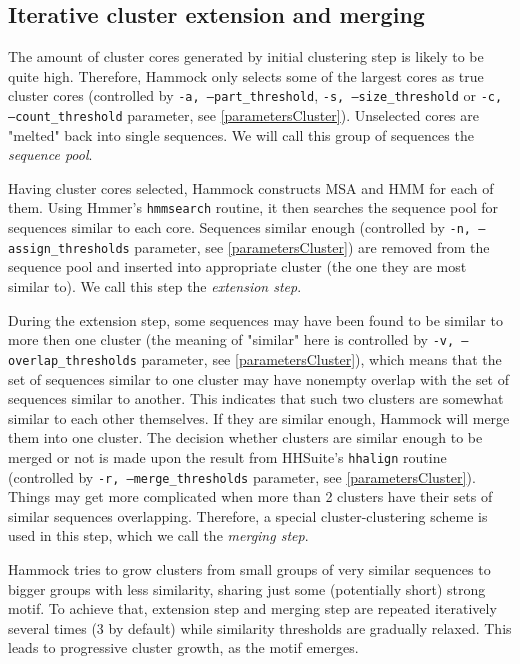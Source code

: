 \documentclass[11pt, a4paper, twoside, titlepage]{article}
\begin{document}
\subsection{Iterative cluster extension and merging}

The amount of cluster cores generated by initial clustering step is likely to be quite high. Therefore, Hammock only selects some of the largest cores as true cluster cores (controlled by \texttt{-a, --part\_threshold}, \texttt{-s, --size\_threshold} or \texttt{-c, --count\_threshold} parameter, see \ref{parametersCluster}). Unselected cores are "melted" back into single sequences. We will call this group of sequences the \emph{sequence pool}.

Having cluster cores selected, Hammock constructs MSA and HMM for each of them. Using Hmmer's \texttt{hmmsearch} routine, it then searches the sequence pool for sequences similar to each core. Sequences similar enough (controlled by \texttt{-n, --assign\_thresholds} parameter, see \ref{parametersCluster}) are removed from the sequence pool and inserted into appropriate cluster (the one they are most similar to). We call this step the \emph{extension step}.

During the extension step, some sequences may have been found to be similar to more then one cluster (the meaning of "similar" here is controlled by \texttt{-v, --overlap\_thresholds} parameter, see \ref{parametersCluster}), which means that the set of sequences similar to one cluster may have nonempty overlap with the set of sequences similar to another. This indicates that such two clusters are somewhat similar to each other themselves. If they are similar enough, Hammock will merge them into one cluster. The decision whether clusters are similar enough to be merged or not is made upon the result from HHSuite's \texttt{hhalign} routine (controlled by \texttt{-r, --merge\_thresholds} parameter, see \ref{parametersCluster}). Things may get more complicated when more than 2 clusters have their sets of similar sequences overlapping. Therefore, a special cluster-clustering scheme is used in this step, which we call the \emph{merging step}. \newline

Hammock tries to grow clusters from small groups of very similar sequences to bigger groups with less similarity, sharing just some (potentially short) strong motif. To achieve that, extension step and merging step are repeated iteratively several times (3 by default) while similarity thresholds are gradually relaxed. This leads to progressive cluster growth, as the motif emerges.
\end{document}
